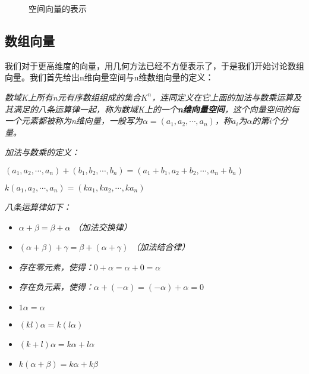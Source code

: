 \documentclass[a4paper]{ctexart}
\begin{document}
\begin{figure}[htp]
\centering
{}
\caption{空间向量的表示}
\end{figure}

\subsection{数组向量}
我们对于更高维度的向量，用几何方法已经不方便表示了，于是我们开始讨论数组向量。我们首先给出n维向量空间与n维数组向量的定义：

\textit{数域K上所有n元有序数组组成的集合$K^n$，连同定义在它上面的加法与数乘运算及其满足的八条运算律一起，称为数域K上的一个\textbf{n维向量空间}，这个向量空间的每一个元素都被称为n维向量，一般写为$\alpha =(a_1,a_2,\cdots,a_n)$，称$a_i$为$\alpha$的第i个分量。}

\textit{加法与数乘的定义：}

\textit{$(a_1,a_2,\cdots,a_n)+(b_1,b_2,\cdots,b_n)=(a_1+b_1,a_2+b_2,\cdots,a_n+b_n)$}

\textit{$k(a_1,a_2,\cdots,a_n)=(ka_1,ka_2,\cdots,ka_n)$}

\textit{八条运算律如下：}

\begin{itemize}
\item \textit{$\alpha+\beta=\beta+\alpha$ （加法交换律）}
\item \textit{$(\alpha+\beta)+\gamma=\beta+(\alpha+\gamma)$ （加法结合律）}
\item \textit{存在零元素，使得：$0+\alpha=\alpha+0=\alpha$}
\item \textit{存在负元素，使得：$\alpha + (-\alpha)=(-\alpha)+\alpha=0$}
\item \textit{$1\alpha=\alpha$}
\item \textit{$(kl)\alpha=k(l\alpha)$}
\item \textit{$(k+l)\alpha=k\alpha+l\alpha$}
\item \textit{$k(\alpha +\beta)=k\alpha +k\beta$}
\end{itemize}
\end{document}
